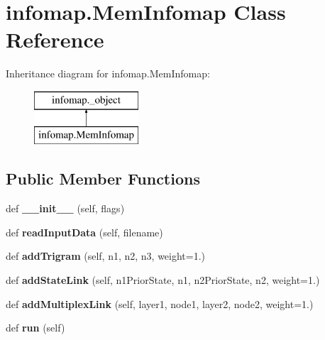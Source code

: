 \hypertarget{classinfomap_1_1MemInfomap}{}\section{infomap.\+Mem\+Infomap Class Reference}
\label{classinfomap_1_1MemInfomap}
Inheritance diagram for infomap.\+Mem\+Infomap\+:\begin{figure}[H]
\begin{center}
\leavevmode
\includegraphics[height=2.000000cm]{classinfomap_1_1MemInfomap}
\end{center}
\end{figure}
\subsection*{Public Member Functions}
\begin{DoxyCompactItemize}
\item 
\mbox{\label{classinfomap_1_1MemInfomap_a869d1136cc61a61dfba1fe8c13eb3c6d}} 
def {\bfseries \+\_\+\+\_\+init\+\_\+\+\_\+} (self, flags)
\item 
\mbox{\label{classinfomap_1_1MemInfomap_a7b6cd1593960567ac4570f867a40bbfd}} 
def {\bfseries read\+Input\+Data} (self, filename)
\item 
\mbox{\label{classinfomap_1_1MemInfomap_a04eafde642cde223ef37194d33cd520d}} 
def {\bfseries add\+Trigram} (self, n1, n2, n3, weight=1.)
\item 
\mbox{\label{classinfomap_1_1MemInfomap_afda427c3851630a103425174b019fa47}} 
def {\bfseries add\+State\+Link} (self, n1\+Prior\+State, n1, n2\+Prior\+State, n2, weight=1.)
\item 
\mbox{\label{classinfomap_1_1MemInfomap_a9b79f0c181c39c6cd1137c89057975f5}} 
def {\bfseries add\+Multiplex\+Link} (self, layer1, node1, layer2, node2, weight=1.)
\item 
\mbox{\label{classinfomap_1_1MemInfomap_aaef931799ebd67b11ce33747119a6483}} 
def {\bfseries run} (self)
\end{DoxyCompactItemize}

